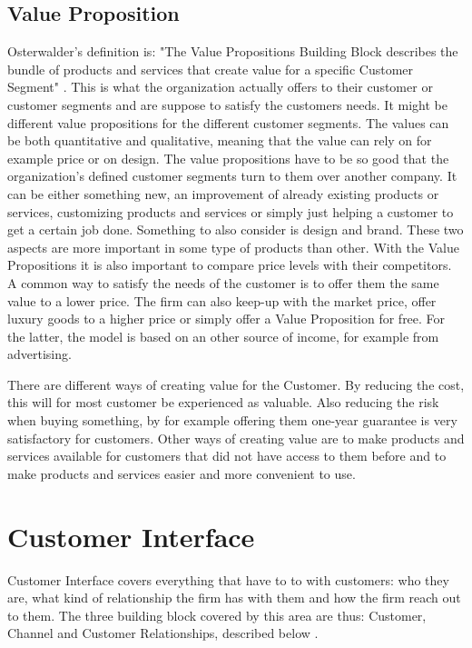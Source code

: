 \subsection{Value Proposition}
Osterwalder's definition is: "The Value Propositions Building Block describes the bundle of products and services that create value for a specific Customer Segment" \cite{osterwalder}. This is what the organization actually offers to their customer or customer segments and are suppose to satisfy the customers needs. It might be different value propositions for the different customer segments. The values can be both quantitative and qualitative, meaning that the value can rely on for example price or on design. The value propositions have to be so good that the organization's defined customer segments turn to them over another company. It can be either something new, an improvement of already existing products or services, customizing products and services or simply just helping a customer to get a certain job done. Something to also consider is design and brand. These two aspects are more important in some type of products than other. With the Value Propositions it is also important to compare price levels with their competitors. A common way to satisfy the needs of the customer is to offer them the same value to a lower price. The firm can also keep-up with the market price, offer luxury goods to a higher price or simply offer a Value Proposition for free. For the latter, the model is based on an other source of income, for example from advertising. 

There are different ways of creating value for the Customer. By reducing the cost, this will for most customer be experienced as valuable. Also reducing the risk when buying something, by for example offering them one-year guarantee is very satisfactory for customers. Other ways of creating value are to make products and services available for customers that did not have access to them before and to make products and services easier and more convenient to use.


\section{Customer Interface}
Customer Interface covers everything that have to to with customers: who they are, what kind of relationship the firm has with them and how the firm reach out to them. The three building block covered by this area are thus: Customer, Channel and Customer Relationships, described below \cite{osterwalderthesis}.

